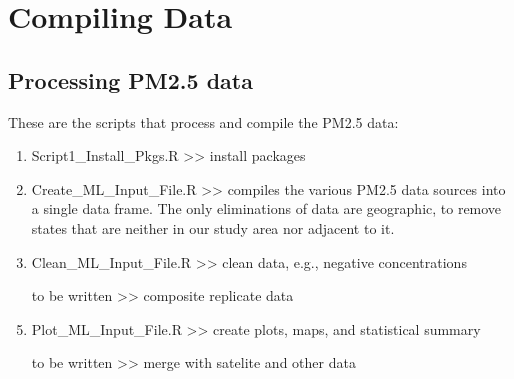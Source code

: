 \section{Compiling Data}

\subsection{Processing PM2.5 data}

These are the scripts that process and compile the PM2.5 data:
\begin{enumerate}[nolistsep]
\item Script1\_Install\_Pkgs.R >> install packages
\item Create\_ML\_Input\_File.R >> compiles the various PM2.5 data sources into a single data frame. The only eliminations of data are geographic, to remove states that are neither in our study area nor adjacent to it.
\item Clean\_ML\_Input\_File.R >> clean data, e.g., negative concentrations
\item [to be written] >> composite replicate data
\item Plot\_ML\_Input\_File.R >> create plots, maps, and statistical summary
\item [to be written] >> merge with satelite and other data
\end{enumerate}
